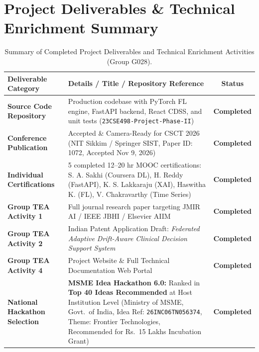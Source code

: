 \documentclass[11pt, a4paper]{article}
\begin{document}
\section{Project Deliverables \& Technical Enrichment Summary}
\begin{table}[!htbp]
    \centering
    \scriptsize
    \renewcommand{\arraystretch}{1.08}
    \begin{tabular}{l p{9.0cm} c}
        \toprule
        \textbf{Deliverable Category} & \textbf{Details / Title / Repository Reference} & \textbf{Status} \\
        \midrule
        \textbf{Source Code Repository} & Production codebase with PyTorch FL engine, FastAPI backend, React CDSS, and unit tests (\texttt{23CSE498-Project-Phase-II}) & \textbf{Completed} \\
        \addlinespace[2pt]
        \textbf{Conference Publication} & Accepted \& Camera-Ready for CSCT 2026 (NIT Sikkim / Springer SIST, Paper ID: 1072, Accepted Nov 9, 2026) & \textbf{Completed} \\
        \addlinespace[2pt]
        \textbf{Individual Certifications} & 5 completed 12--20 hr MOOC certifications: S. A. Sakhi (Coursera DL), H. Reddy (FastAPI), K. S. Lakkaraju (XAI), Haswitha K. (FL), V. Chakravarthy (Time Series) & \textbf{Completed} \\
        \addlinespace[2pt]
        \textbf{Group TEA Activity 1} & Full journal research paper targeting JMIR AI / IEEE JBHI / Elsevier AIIM & \textbf{Completed} \\
        \addlinespace[2pt]
        \textbf{Group TEA Activity 2} & Indian Patent Application Draft: \textit{Federated Adaptive Drift-Aware Clinical Decision Support System} & \textbf{Completed} \\
        \addlinespace[2pt]
        \textbf{Group TEA Activity 4} & Project Website \& Full Technical Documentation Web Portal & \textbf{Completed} \\
        \addlinespace[2pt]
        \textbf{National Hackathon Selection} & \textbf{MSME Idea Hackathon 6.0:} Ranked in \textbf{Top 40 Ideas Recommended} at Host Institution Level (Ministry of MSME, Govt.\ of India, Idea Ref: \texttt{26INC06TN056374}, Theme: Frontier Technologies, Recommended for Rs.~15 Lakhs Incubation Grant) & \textbf{Completed} \\
        \bottomrule
    \end{tabular}
    \caption{Summary of Completed Project Deliverables and Technical Enrichment Activities (Group G028).}
    \label{tab:deliverables}
\end{table}
\end{document}
